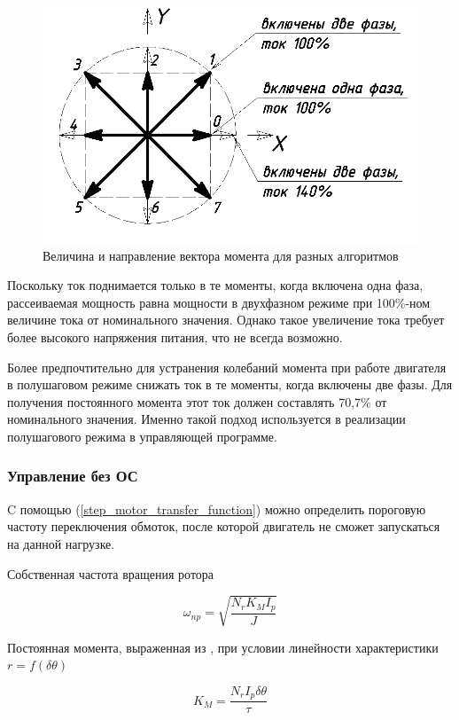 \begin{figure}
    \centering
    \includegraphics[width=0.6\linewidth, keepaspectratio]
                    {./src/pictures/control_algo/torque_diag}
    \caption{Величина и направление вектора момента для разных алгоритмов}
    \label{pic_torque_diagram}
\end{figure}

Поскольку ток поднимается только в те моменты, когда включена одна фаза, рассеиваемая
мощность равна мощности в двухфазном режиме при 100\%-ном величине тока от
номинального значения. Однако такое увеличение тока требует более высокого
напряжения питания, что не всегда возможно.

Более предпочтительно для устранения колебаний момента при работе двигателя в
полушаговом режиме снижать ток в те моменты, когда включены две фазы. Для
получения постоянного момента этот ток должен составлять 70,7\% от номинального
значения. Именно такой подход используется в реализации полушагового режима
в управляющей программе.


\newpage
\subsubsection{Управление без ОС}
C помощью (\ref{step_motor_transfer_function}) можно определить пороговую
частоту переключения обмоток, после которой двигатель не сможет запускаться на данной нагрузке.

Собственная частота вращения ротора \cite[гл. 4.2, ф-ла 4.48]{Kenio}

\begin{equation}
    \label{rotor_natural_frequency}
    \omega_{np} = \sqrt{\frac{N_{r}K_{M}I_{p}}{J}}
\end{equation}

Постоянная момента, выраженная из \cite[гл. 4.2, ф-ла 4.52]{Kenio}, при условии
линейности характеристики $r = f(\delta\theta)$

\begin{equation}
    \label{torque_coeff}
    K_{M} = \frac{N_{r}I_{p}\delta\theta}{\tau}
\end{equation}

